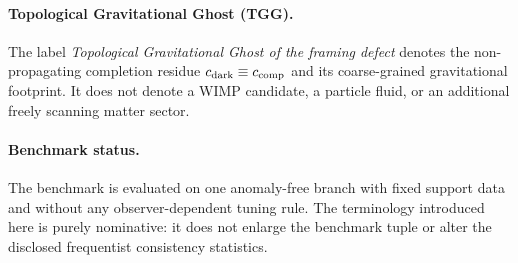 \documentclass[11pt]{article}
\begin{document}
\paragraph{Topological Gravitational Ghost (TGG).}
The label \emph{Topological Gravitational Ghost of the framing defect} denotes
the non-propagating completion residue $c_{\rm dark}\equiv c_{\rm comp}$ and
its coarse-grained gravitational footprint. It does not denote a WIMP
candidate, a particle fluid, or an additional freely scanning matter sector.

\paragraph{Benchmark status.}
The benchmark is evaluated on one anomaly-free branch with fixed support data
and without any observer-dependent tuning rule. The terminology introduced here
is purely nominative: it does not enlarge the benchmark tuple or alter the
disclosed frequentist consistency statistics.
\end{document}
